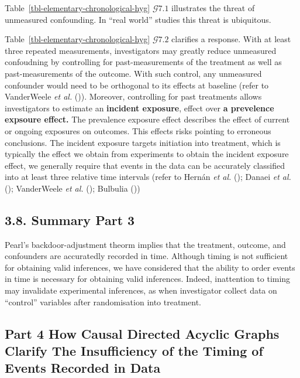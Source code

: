 \documentclass[
  single column]{article}
\begin{document}
Table~\ref{tbl-elementary-chronological-hyg} \(\mathcal{G} 7.1\)
illustrates the threat of unmeasured confounding. In ``real world''
studies this threat is ubiquitous.

Table~\ref{tbl-elementary-chronological-hyg} \(\mathcal{G} 7.2\)
clarifies a response. With at least three repeated measurements,
investigators may greatly reduce unmeasured confoudning by controlling
for past-measurements of the treatment as well as past-measurements of
the outcome. With such control, any unmeasured confounder would need to
be orthogonal to its effects at baseline (refer to VanderWeele \emph{et
al.} ()). Moreover, controlling for
past treatments allows investigators to estimate an \textbf{incident
exposure}, effect over \textbf{a prevelence expsoure effect.} The
prevalence exposure effect describes the effect of current or ongoing
exposures on outcomes. This effects risks pointing to erroneous
conclusions. The incident exposure targets initiation into treatment,
which is typically the effect we obtain from experiments to obtain the
incident exposure effect, we generally require that events in the data
can be accurately classified into at least three relative time intervals
(refer to Hernán \emph{et al.} ();
Danaei \emph{et al.} (); VanderWeele
\emph{et al.} (); Bulbulia
())

\subsection{3.8. Summary Part 3}\label{summary-part-3}

Pearl's backdoor-adjustment theorm implies that the treatment, outcome,
and confounders are accuratedly recorded in time. Although timing is not
sufficient for obtaining valid inferences, we have considered that the
ability to order events in time is necessary for obtaining valid
inferences. Indeed, inattention to timing may invalidate experimental
inferences, as when investigator collect data on ``control'' variables
after randomisation into treatment.

\newpage{}

\subsection{Part 4 How Causal Directed Acyclic Graphs Clarify The
Insufficiency of the Timing of Events Recorded in
Data}\label{part-4-how-causal-directed-acyclic-graphs-clarify-the-insufficiency-of-the-timing-of-events-recorded-in-data}
\end{document}
